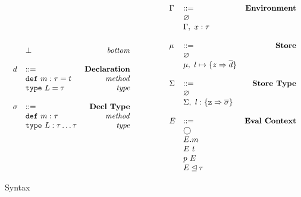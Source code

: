 \documentclass{llncs}
\numberwithin{subcase}{case}
\numberwithin{case}{theorem}
\numberwithin{case}{lemma}
\begin{document}
\begin{figure}[h]
\[\begin{array}{lllll}
\begin{array}{llr}
		& \bot 													&\text{\emph{bottom}}\\
&&\\
d 		& ::= 														&\text{\bf{Declaration}} \\
  		& \text{\texttt{def}} \ m : \tau = t 				&\text{\emph{method}}\\
  		& \text{\texttt{type}} \ L = \tau					&\text{\emph{type}}\\
&&\\
\sigma	& ::= 														&\text{\bf{Decl Type}}\\
		& \text{\texttt{def}} \ m:\tau						&\text{\emph{method}}\\
  		& \text{\texttt{type}} \ L : \tau \ldots  \tau			&\text{\emph{type}}\\
\end{array}
& ~~~~~~
&
\begin{array}{llr}
\Gamma	& :: = 													&\text{\bf{Environment}} \\
		& \varnothing 											&\\
		& \Gamma,\ x : \tau 									&\\
&&\\
\mu 	& :: = 													& \text{\bf{Store}}\\
		& \varnothing 											&\\
		& \mu,\ l \mapsto \{z \Rightarrow \overline{d}\}	&\\
&&\\
\Sigma	& :: = 													&\text{\bf{Store Type}}\\
		& \varnothing 											&\\
		& \Sigma,\ l : \{\texttt{z} \Rightarrow \overline{\sigma}\}	&\\
&&\\
E 		& :: = 													& \text{\bf{Eval Context}}\\
		& \bigcirc 												&\\
		& E.m 														&\\
		& E\ t 													&\\
		& p\ E 													&\\
		& E \unlhd \tau											&\\
\end{array}
\end{array}
\]
\caption{Syntax}
\label{f:syntax}
\end{figure}
\end{document}

